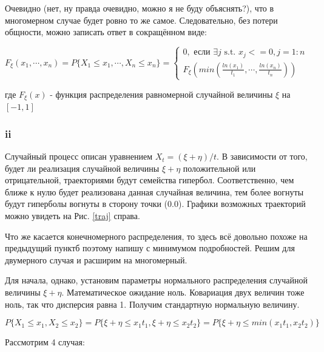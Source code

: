 \documentclass[a4paper,12pt]{article}
\begin{document}
\begin{enumerate}[\Sun]
	Очевидно (нет, ну правда очевидно, можно я не буду объяснять?), что в многомерном случае будет ровно то же самое. Следовательно, без потери общности, можно записать ответ в сокращённом виде:
	
	$ F_\xi(x_1, \cdots, x_n) = P\{X_1 \le x_1,\cdots, X_n \le x_n\} = 
	\begin{cases}
	0, \text{ если }  \exists j \text{ s.t. } x_j <= 0, j = 1:n \\
	F_\xi\left(min\left(\frac{ln(x_1)}{t_1},  \cdots, \frac{ln(x_n)}{t_n}\right) \right)
	\end{cases} $
	
	где $ F_\xi(x) $ - функция распределения равномерной случайной величины $ \xi $ на $ [-1, 1] $
	
\end{enumerate}

\subsubsection{ii}
Случайный процесс описан уравнением $X_{t}=(\xi+\eta) / t$. В зависимости от того, будет ли реализация случайной величины $ \xi + \eta $ положительной или отрицательной, траекториями будут семейства гипербол. Соответственно, чем ближе к нулю будет реализована данная случайная величина, тем более вогнуты будут гиперболы вогнуты в сторону точки (0.0). Графики возможных траекторий можно увидеть на Рис. \ref{traj} справа.


Что же касается конечномерного распределения, то здесь всё довольно похоже на предыдущий пунктб поэтому напишу с минимумом подробностей. Решим для двумерного случая и расширим на многомерный.

Для начала, однако, установим параметры нормального распределения случайной величины $ \xi + \eta $. Математическое ожидание ноль. Ковариация двух величин тоже ноль, так что дисперсия равна 1. Получим стандартную нормальную величину.

\[  P\{X_1 \le x_1, X_2 \le x_2\} = P\{ \xi + \eta \le x_1 t_1, \xi + \eta \le x_2 t_2 \} = P\{ \xi + \eta \le min(x_1 t_1, x_2 t_2) \} \]

Рассмотрим 4 случая:
\end{document}
